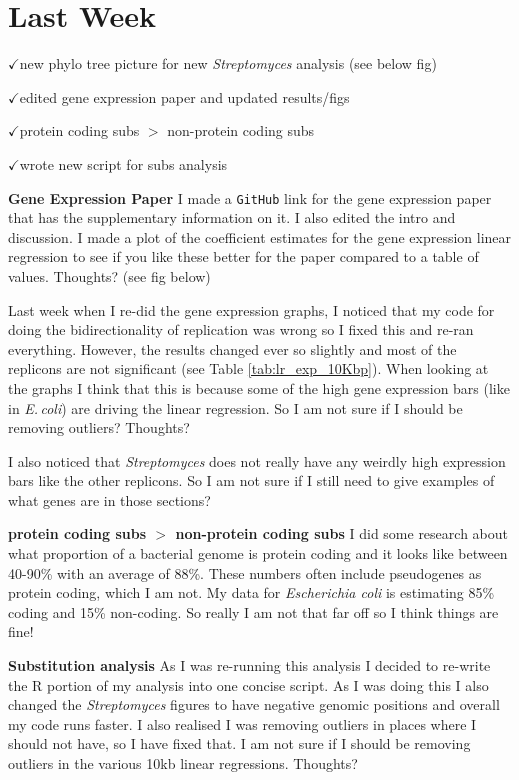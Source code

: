 \documentclass[12pt]{article}
\newcommand{\strep}{\textit{Streptomyces}\xspace}
\newcommand{\ecol}{\textit{E.\,coli}\xspace}
\newcommand{\ecoli}{\textit{Escherichia coli}\xspace}
\newcommand{\ch}{$\checkmark$}
\begin{document}

	
\section*{Last Week}

\ch new phylo tree picture for new \strep analysis (see below fig)

\ch edited gene expression paper and updated results/figs 

\ch protein coding subs $>$ non-protein coding subs

\ch wrote new script for subs analysis

\textbf{Gene Expression Paper}
I made a \texttt{GitHub} link for the gene expression paper that has the supplementary information on it.
I also edited the intro and discussion.
I made a plot of the coefficient estimates for the gene expression linear regression to see if you like these better for the paper compared to a table of values. Thoughts? (see fig below)

Last week when I re-did the gene expression graphs, I noticed that my code for doing the bidirectionality of replication was wrong so I fixed this and re-ran everything.
However, the results changed ever so slightly and most of the replicons are not significant (see Table \ref{tab:lr_exp_10Kbp}).
When looking at the graphs I think that this is because some of the high gene expression bars (like in \ecol) are driving the linear regression.
So I am not sure if I should be removing outliers? Thoughts?

I also noticed that \strep does not really have any weirdly high expression bars like the other replicons. So I am not sure if I still need to give examples of what genes are in those sections?

\textbf{protein coding subs $>$ non-protein coding subs}
I did some research about what proportion of a bacterial genome is protein coding and it looks like between 40-90\% with an average of 88\%. These numbers often include pseudogenes as protein coding, which I am not.
My data for \ecoli is estimating 85\% coding and 15\% non-coding. So really I am not that far off so I think things are fine!


\textbf{Substitution analysis}
As I was re-running this analysis I decided to re-write the R portion of my analysis into one concise script.
As I was doing this I also changed the \strep figures to have negative genomic positions and overall my code runs faster.
I also realised I was removing outliers in places where I should not have, so I have fixed that.  
I am not sure if I should be removing outliers in the various 10kb linear regressions. Thoughts?
\end{document}
